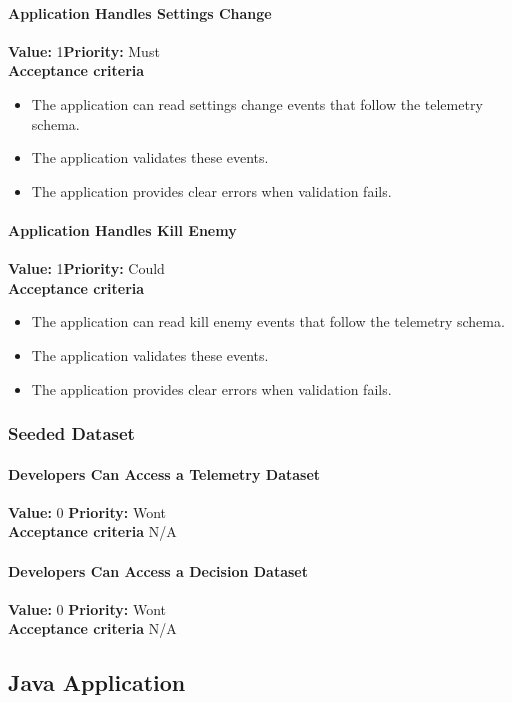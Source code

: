 \paragraph{Application Handles Settings Change}
\textbf{Value:} 1\quad \textbf{Priority:} Must\\
\textbf{Acceptance criteria}
\begin{itemize}
  \item The application can read settings change events that follow the telemetry schema.
  \item The application validates these events.
  \item The application provides clear errors when validation fails.
\end{itemize}

\paragraph{Application Handles Kill Enemy}
\textbf{Value:} 1\quad \textbf{Priority:} Could\\
\textbf{Acceptance criteria}
\begin{itemize}
  \item The application can read kill enemy events that follow the telemetry schema.
  \item The application validates these events.
  \item The application provides clear errors when validation fails.
\end{itemize}

\subsubsection{Seeded Dataset}

\paragraph{Developers Can Access a Telemetry Dataset}
\textbf{Value:} 0 \quad \textbf{Priority:} Wont\\
\textbf{Acceptance criteria} N/A

\paragraph{Developers Can Access a Decision Dataset}
\textbf{Value:} 0 \quad \textbf{Priority:} Wont\\
\textbf{Acceptance criteria} N/A

\subsection{Java Application}

